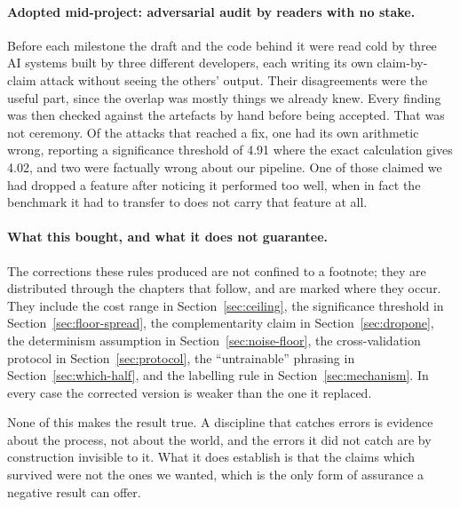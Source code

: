 \paragraph{Adopted mid-project: adversarial audit by readers with no stake.}
Before each milestone the draft and the code behind it were read cold by three
AI systems built by three different developers, each writing its own
claim-by-claim attack without seeing the others' output. Their disagreements were the useful part, since the overlap was mostly things we already knew. Every
finding was then checked against the artefacts by hand before being accepted.
That was not ceremony. Of the attacks that reached a fix, one had its own
arithmetic wrong, reporting a significance threshold of 4.91\pp{} where
the exact calculation gives 4.02\pp, and two were factually wrong about
our pipeline. One of those claimed we had dropped a feature after noticing it
performed too well, when in fact the benchmark it had to transfer to does not
carry that feature at all.

\paragraph{What this bought, and what it does not guarantee.} The corrections
these rules produced are not confined to a footnote; they are distributed through
the chapters that follow, and are marked where they occur. They include the cost
range in Section~\ref{sec:ceiling}, the significance threshold in
Section~\ref{sec:floor-spread}, the complementarity claim in
Section~\ref{sec:dropone}, the determinism assumption in
Section~\ref{sec:noise-floor}, the cross-validation protocol in
Section~\ref{sec:protocol}, the ``untrainable'' phrasing in
Section~\ref{sec:which-half}, and the labelling rule in
Section~\ref{sec:mechanism}. In every case the corrected version is weaker than
the one it replaced.

None of this makes the result true. A discipline that catches errors is evidence
about the process, not about the world, and the errors it did not catch are by
construction invisible to it. What it does establish is that the claims which survived were not the ones we wanted, which is the only form of assurance a
negative result can offer.

